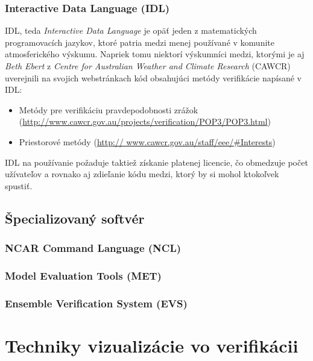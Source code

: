 \subsubsection[IDL]{Interactive Data Language (IDL)}
IDL, teda \textit{Interactive Data Language} je opäť jeden z matematických programovacích jazykov, ktoré patria medzi menej používané v komunite atmosferického výskumu. Napriek tomu niektorí výskumníci medzi, ktorými je aj \textit{Beth Ebert} z \textit{Centre for Australian Weather and Climate Research} (CAWCR) uverejnili na svojich webstránkach kód obsahujúci metódy verifikácie napísané v IDL:
\begin{itemize}
	\item Metódy pre verifikáciu pravdepodobnosti zrážok 	(\url{http://www.cawcr.gov.au/projects/verification/POP3/POP3.html})
	\item Priestorové metódy (\url{http://
		www.cawcr.gov.au/staff/eee/#Interests})
\end{itemize} 
IDL na používanie požaduje taktiež získanie platenej licencie, čo obmedzuje počet užívateľov a rovnako aj zdieľanie kódu medzi, ktorý by si mohol ktokoľvek spustiť.


\subsection{Špecializovaný softvér}

\subsubsection[NCL]{NCAR Command Language (NCL)}

\subsubsection[MET]{Model Evaluation Tools (MET)}

\subsubsection[EVS]{Ensemble Verification System (EVS)}



\section{Techniky vizualizácie vo verifikácii}
\label{sec:prevvis}

